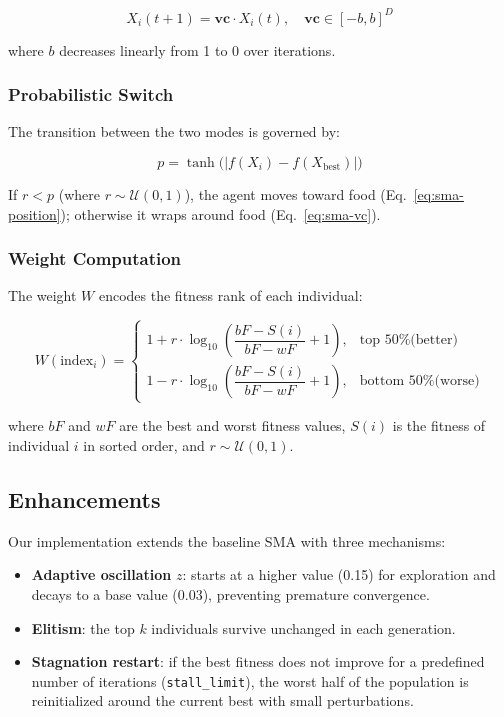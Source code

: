 \documentclass[12pt,a4paper,oneside]{report}
\begin{document}
\begin{equation}\label{eq:sma-vc}
X_i(t+1) = \mathbf{vc} \cdot X_i(t), \quad \mathbf{vc} \in [-b, b]^D
\end{equation}

where $b$ decreases linearly from 1 to 0 over iterations.

\subsubsection{Probabilistic Switch}

The transition between the two modes is governed by:

\begin{equation}\label{eq:sma-p}
p = \tanh\bigl( |f(X_i) - f(X_{\text{best}})| \bigr)
\end{equation}

If $r < p$ (where $r \sim \mathcal{U}(0,1)$), the agent moves toward food (Eq.~\ref{eq:sma-position}); otherwise it wraps around food (Eq.~\ref{eq:sma-vc}).

\subsubsection{Weight Computation}

The weight $W$ encodes the fitness rank of each individual:

\begin{equation}\label{eq:sma-weight}
W(\text{index}_i) =
\begin{cases}
1 + r \cdot \log_{10}\!\left( \dfrac{bF - S(i)}{bF - wF} + 1 \right), & \text{top 50\% (better)} \\[10pt]
1 - r \cdot \log_{10}\!\left( \dfrac{bF - S(i)}{bF - wF} + 1 \right), & \text{bottom 50\% (worse)}
\end{cases}
\end{equation}

where $bF$ and $wF$ are the best and worst fitness values, $S(i)$ is the fitness of individual $i$ in sorted order, and $r \sim \mathcal{U}(0,1)$.

\subsection{Enhancements}

Our implementation extends the baseline SMA with three mechanisms:

\begin{itemize}[itemsep=4pt]
    \item \textbf{Adaptive oscillation} $z$: starts at a higher value (0.15) for exploration and decays to a base value (0.03), preventing premature convergence.
    \item \textbf{Elitism}: the top $k$ individuals survive unchanged in each generation.
    \item \textbf{Stagnation restart}: if the best fitness does not improve for a predefined number of iterations (\texttt{stall\_limit}), the worst half of the population is reinitialized around the current best with small perturbations.
\end{itemize}
\end{document}
